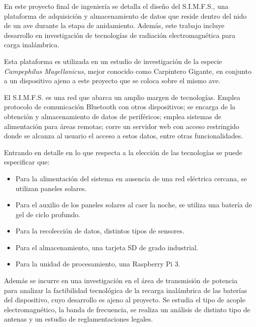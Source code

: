 En este proyecto final de ingeniería se detalla el diseño del S.I.M.F.S., una plataforma de adquisición y almacenamiento de datos que reside dentro del nido de un ave durante la etapa de anidamiento. Además, este trabajo incluye desarrollo en investigación de tecnologías de radiación electromagnética para carga inalámbrica.

Esta plataforma es utilizada en un estudio de investigación de la especie \textit{Campephilus Magellanicus}, mejor conocido como Carpintero Gigante, en conjunto a un dispositivo ajeno a este proyecto que se coloca sobre el mismo ave.

El S.I.M.F.S. es una red que abarca un amplio margen de tecnologías. Emplea protocolo de comunicación Bluetooth con otros dispositivos; se encarga de la obtención y almacenamiento de datos de periféricos; emplea sistemas de alimentación para áreas remotas; corre un servidor web con acceso restringido donde se alcanza al usuario el acceso a estos datos, entre otras funcionalidades.


Entrando en detalle en lo que respecta a la elección de las tecnologías se puede especificar que:
\begin{itemize}
	\item Para la alimentación del sistema en ausencia de una red eléctrica cercana, se utilizan paneles solares.
	\item Para el auxilio de los paneles solares al caer la noche, se utiliza una batería de gel de ciclo profundo.
	\item Para la recolección de datos, distintos tipos de sensores.
	\item Para el almacenamiento, una tarjeta SD de grado industrial.
	\item Para la unidad de procesamiento, una Raspberry Pi 3.
\end{itemize}

Además se incurre en una investigación en el área de transmisión de potencia para analizar la factibilidad tecnológica de la recarga inalámbrica de las baterías del dispositivo, cuyo desarrollo es ajeno al proyecto. Se estudia el tipo de acople electromagnético, la banda de frecuencia, se realiza un análisis de distinto tipo de antenas y un estudio de reglamentaciones legales.

